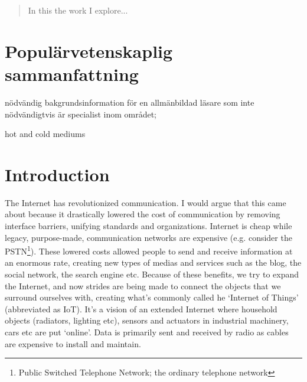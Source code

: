 \documentclass[final,a4paper,twoside,11pt,onecolumn]{report}
\begin{document}
\maketitle

% 
% 

\begin{abstract}
In this the work I explore...
\end{abstract}

\setcounter{tocdepth}{4}
\tableofcontents

\chapter{Populärvetenskaplig sammanfattning}
nödvändig bakgrundsinformation för en allmänbildad läsare som inte nödvändigtvis är specialist inom området;

hot and cold mediums

\chapter{Introduction}
\label{cha:intro}
The Internet has revolutionized communication. I would argue that this came about because it drastically lowered the cost of communication by removing interface barriers, unifying standards and organizations. Internet is cheap while legacy, purpose-made, communication networks are expensive (e.g. consider the PSTN\footnote{Public Switched Telephone Network; the ordinary telephone network}). These lowered costs allowed people to send and receive information at an enormous rate, creating new types of medias and services such as the blog, the social network, the search engine etc. Because of these benefits, we try to expand the Internet, and now strides are being made to connect the objects that we surround ourselves with, creating what's commonly called he `Internet of Things' (abbreviated as IoT). It's a vision of an extended Internet where household objects (radiators, lighting etc), sensors and actuators in industrial machinery, cars etc are put `online'. Data is primarily sent and received by radio as cables are expensive to install and maintain.
\end{document}
